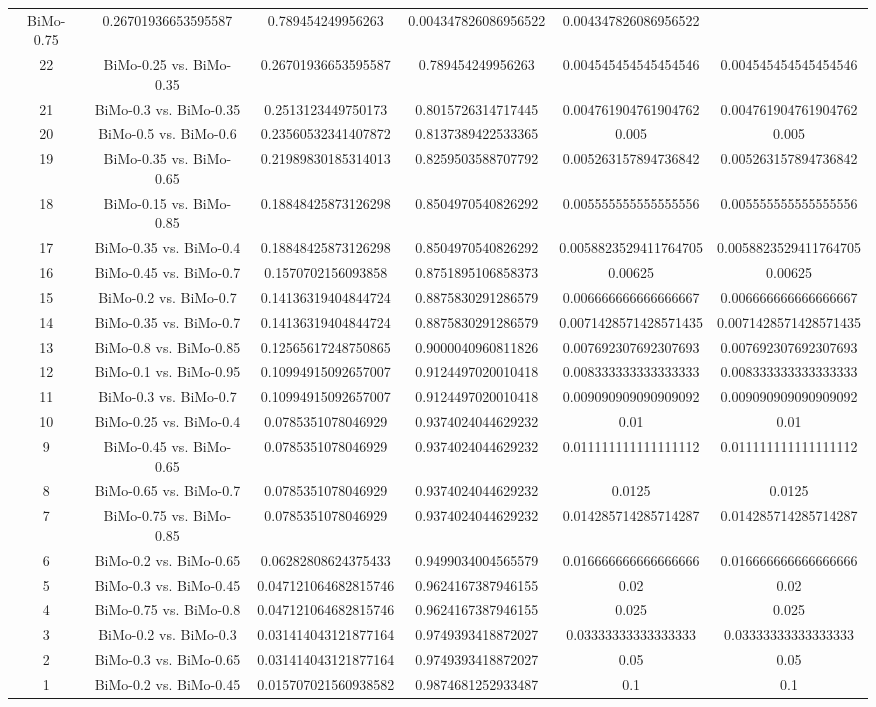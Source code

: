 \documentclass[a4paper,10pt]{article}
\begin{document}
\begin{landscape}
\begin{table}[!htp]
\begin{tabular}{cccccc}
BiMo-0.75&0.26701936653595587&0.789454249956263&0.004347826086956522&0.004347826086956522\\22&BiMo-0.25 vs. BiMo-0.35&0.26701936653595587&0.789454249956263&0.004545454545454546&0.004545454545454546\\21&BiMo-0.3 vs. BiMo-0.35&0.2513123449750173&0.8015726314717445&0.004761904761904762&0.004761904761904762\\20&BiMo-0.5 vs. BiMo-0.6&0.23560532341407872&0.8137389422533365&0.005&0.005\\19&BiMo-0.35 vs. BiMo-0.65&0.21989830185314013&0.8259503588707792&0.005263157894736842&0.005263157894736842\\18&BiMo-0.15 vs. BiMo-0.85&0.18848425873126298&0.8504970540826292&0.005555555555555556&0.005555555555555556\\17&BiMo-0.35 vs. BiMo-0.4&0.18848425873126298&0.8504970540826292&0.0058823529411764705&0.0058823529411764705\\16&BiMo-0.45 vs. BiMo-0.7&0.1570702156093858&0.8751895106858373&0.00625&0.00625\\15&BiMo-0.2 vs. BiMo-0.7&0.14136319404844724&0.8875830291286579&0.006666666666666667&0.006666666666666667\\14&BiMo-0.35 vs. BiMo-0.7&0.14136319404844724&0.8875830291286579&0.0071428571428571435&0.0071428571428571435\\13&BiMo-0.8 vs. BiMo-0.85&0.12565617248750865&0.9000040960811826&0.007692307692307693&0.007692307692307693\\12&BiMo-0.1 vs. BiMo-0.95&0.10994915092657007&0.9124497020010418&0.008333333333333333&0.008333333333333333\\11&BiMo-0.3 vs. BiMo-0.7&0.10994915092657007&0.9124497020010418&0.009090909090909092&0.009090909090909092\\10&BiMo-0.25 vs. BiMo-0.4&0.0785351078046929&0.9374024044629232&0.01&0.01\\9&BiMo-0.45 vs. BiMo-0.65&0.0785351078046929&0.9374024044629232&0.011111111111111112&0.011111111111111112\\8&BiMo-0.65 vs. BiMo-0.7&0.0785351078046929&0.9374024044629232&0.0125&0.0125\\7&BiMo-0.75 vs. BiMo-0.85&0.0785351078046929&0.9374024044629232&0.014285714285714287&0.014285714285714287\\6&BiMo-0.2 vs. BiMo-0.65&0.06282808624375433&0.9499034004565579&0.016666666666666666&0.016666666666666666\\5&BiMo-0.3 vs. BiMo-0.45&0.047121064682815746&0.9624167387946155&0.02&0.02\\4&BiMo-0.75 vs. BiMo-0.8&0.047121064682815746&0.9624167387946155&0.025&0.025\\3&BiMo-0.2 vs. BiMo-0.3&0.031414043121877164&0.9749393418872027&0.03333333333333333&0.03333333333333333\\2&BiMo-0.3 vs. BiMo-0.65&0.031414043121877164&0.9749393418872027&0.05&0.05\\1&BiMo-0.2 vs. BiMo-0.45&0.015707021560938582&0.9874681252933487&0.1&0.1\\\hline

\end{tabular}
\end{table}
\end{landscape}
\end{document}
